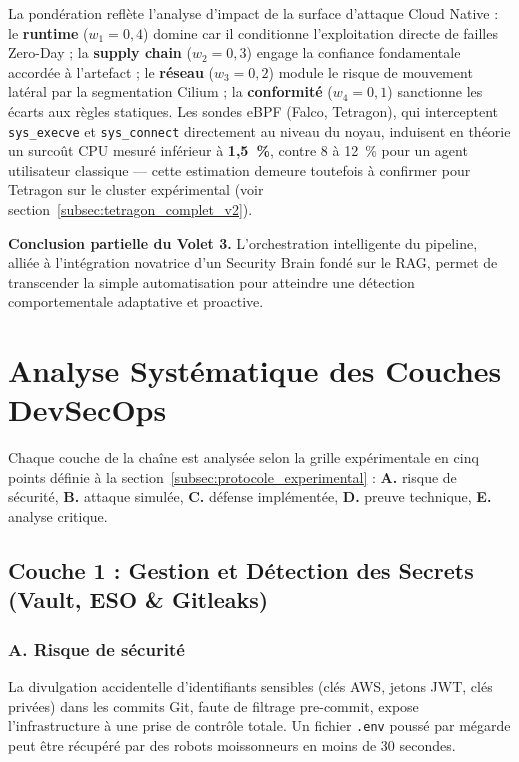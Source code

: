 La pondération reflète l'analyse d'impact de la surface d'attaque Cloud Native : le \textbf{runtime} ($w_1=0{,}4$) domine car il conditionne l'exploitation directe de failles Zero-Day ; la \textbf{supply chain} ($w_2=0{,}3$) engage la confiance fondamentale accordée à l'artefact ; le \textbf{réseau} ($w_3=0{,}2$) module le risque de mouvement latéral par la segmentation Cilium ; la \textbf{conformité} ($w_4=0{,}1$) sanctionne les écarts aux règles statiques. Les sondes eBPF (Falco, Tetragon), qui interceptent \texttt{sys\_execve} et \texttt{sys\_connect} directement au niveau du noyau, induisent en théorie un surcoût CPU mesuré inférieur à \textbf{1,5~\%}, contre 8 à 12~\% pour un agent utilisateur classique — cette estimation demeure toutefois à confirmer pour Tetragon sur le cluster expérimental (voir section~\ref{subsec:tetragon_complet_v2}).

\bigskip
\noindent\textbf{Conclusion partielle du Volet 3.} L'orchestration intelligente du pipeline, alliée à l'intégration novatrice d'un Security Brain fondé sur le RAG, permet de transcender la simple automatisation pour atteindre une détection comportementale adaptative et proactive.


\section{Analyse Systématique des Couches DevSecOps}
\label{sec:analyse_systematique_couches}

Chaque couche de la chaîne est analysée selon la grille expérimentale en cinq points définie à la section~\ref{subsec:protocole_experimental} : \textbf{A.} risque de sécurité, \textbf{B.} attaque simulée, \textbf{C.} défense implémentée, \textbf{D.} preuve technique, \textbf{E.} analyse critique.

\subsection{Couche 1 : Gestion et Détection des Secrets (Vault, ESO \& Gitleaks)}

\subsubsection{A. Risque de sécurité}
La divulgation accidentelle d'identifiants sensibles (clés AWS, jetons JWT, clés privées) dans les commits Git, faute de filtrage pre-commit, expose l'infrastructure à une prise de contrôle totale. Un fichier \texttt{.env} poussé par mégarde peut être récupéré par des robots moissonneurs en moins de 30 secondes.

